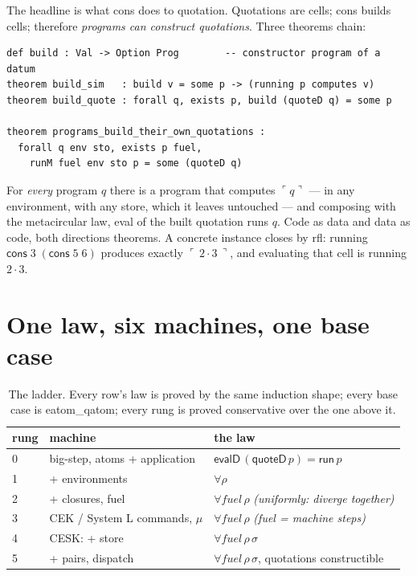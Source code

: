 \documentclass[acmsmall,screen,review]{acmart}
\begin{document}
The headline is what \textsf{cons} does to quotation. Quotations are
cells; \textsf{cons} builds cells; therefore \emph{programs can
construct quotations}. Three theorems chain:

\begin{lstlisting}
def build : Val -> Option Prog        -- constructor program of a datum
theorem build_sim   : build v = some p -> (running p computes v)
theorem build_quote : forall q, exists p, build (quoteD q) = some p

theorem programs_build_their_own_quotations :
  forall q env sto, exists p fuel,
    runM fuel env sto p = some (quoteD q)
\end{lstlisting}

For \emph{every} program $q$ there is a program that computes
$\ulcorner q \urcorner$ --- in any environment, with any store, which
it leaves untouched --- and composing with the metacircular law, eval
of the built quotation runs $q$. Code as data and data as code, both
directions theorems. A concrete instance closes by \textsf{rfl}:
running $\mathsf{cons}\;3\;(\mathsf{cons}\;5\;6)$ produces exactly
$\ulcorner\, 2 \cdot 3 \,\urcorner$, and evaluating that cell is
running $2 \cdot 3$.

\section{One law, six machines, one base case}
\label{sec:punchline}

\begin{table}[h]
\caption{The ladder. Every row's law is proved by the same induction
shape; every base case is \textsf{eatom\_qatom}; every rung is proved
conservative over the one above it.}
\label{tab:ladder}
\begin{tabular}{lll}
\toprule
rung & machine & the law \\
\midrule
0 & big-step, atoms + application &
  $\mathsf{evalD}\,(\mathsf{quoteD}\,p) = \mathsf{run}\,p$ \\
1 & + environments &
  $\forall \rho$ \\
2 & + closures, fuel &
  $\forall \mathit{fuel}\,\rho$ \emph{(uniformly: diverge together)} \\
3 & CEK / System L commands, $\mu$ &
  $\forall \mathit{fuel}\,\rho$ \emph{(fuel = machine steps)} \\
4 & CESK: + store &
  $\forall \mathit{fuel}\,\rho\,\sigma$ \\
5 & + pairs, dispatch &
  $\forall \mathit{fuel}\,\rho\,\sigma$, quotations constructible \\
\bottomrule
\end{tabular}
\end{table}
\end{document}
